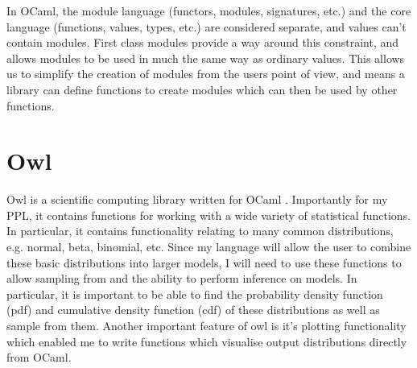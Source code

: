 In OCaml, the module language (functors, modules, signatures, etc.) and the core language (functions, values, types, etc.) are considered separate, and values can't contain modules. First class modules provide a way around this constraint, and allows modules to be used in much the same way as ordinary values. This allows us to simplify the creation of modules from the users point of view, and means a library can define functions to create modules which can then be used by other functions.
	
\section{Owl}
	
Owl is a scientific computing library written for OCaml \cite{owl}. Importantly for my PPL, it contains functions for working with a wide variety of statistical functions. In particular, it contains functionality relating to many common distributions, e.g. normal, beta, binomial, etc. Since my language will allow the user to combine these basic distributions into larger models, I will need to use these functions to allow sampling from and the ability to perform inference on models. In particular, it is important to be able to find the probability density function (pdf) and cumulative density function (cdf) of these distributions as well as sample from them. Another important feature of owl is it's plotting functionality which enabled me to write functions which visualise output distributions directly from OCaml.

